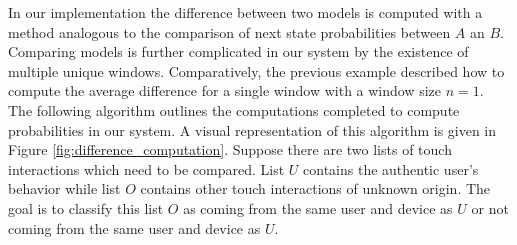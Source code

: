 In our implementation
the difference between two models is computed with a
method analogous to the comparison of 
next state probabilities between $A$ an $B$.
%
Comparing models
is further complicated in our system
by the existence of multiple unique windows.
Comparatively, the previous example described how
to compute the average difference for a single window
with a window size $n=1$.
%
The following algorithm outlines
the computations completed to compute probabilities in our system.
%
A visual representation of this algorithm is given in
Figure \ref{fig:difference_computation}.
%
Suppose there are two lists of touch interactions which need to 
be compared.
List $U$ contains the authentic user's behavior while
list $O$ contains other touch interactions of unknown origin.
The goal is to classify this list $O$ as 
coming from the same user and device as $U$ or
not coming from the same user and device as $U$.
%
